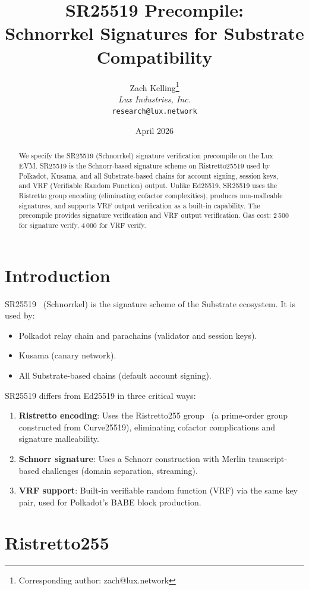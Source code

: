 \documentclass[11pt,a4paper]{article}
\title{SR25519 Precompile:\\Schnorrkel Signatures for Substrate Compatibility}
\author{
Zach Kelling\thanks{Corresponding author: zach@lux.network}\\
\textit{Lux Industries, Inc.}\\
\texttt{research@lux.network}
}
\date{April 2026}
\begin{document}
\luxcoverpage

\begin{abstract}
We specify the SR25519 (Schnorrkel) signature verification precompile on the
Lux EVM. SR25519 is the Schnorr-based signature scheme on Ristretto25519
used by Polkadot, Kusama, and all Substrate-based chains for account signing,
session keys, and VRF (Verifiable Random Function) output. Unlike Ed25519,
SR25519 uses the Ristretto group encoding (eliminating cofactor complexities),
produces non-malleable signatures, and supports VRF output verification as a
built-in capability. The precompile provides signature verification and VRF
output verification. Gas cost: 2\,500 for signature verify, 4\,000 for VRF verify.
\end{abstract}

\section{Introduction}

SR25519~\cite{schnorrkel} (Schnorrkel) is the signature scheme of the Substrate
ecosystem. It is used by:
\begin{itemize}
  \item Polkadot relay chain and parachains (validator and session keys).
  \item Kusama (canary network).
  \item All Substrate-based chains (default account signing).
\end{itemize}

SR25519 differs from Ed25519 in three critical ways:
\begin{enumerate}[label=(\roman*)]
  \item \textbf{Ristretto encoding}: Uses the Ristretto255 group~\cite{ristretto}
    (a prime-order group constructed from Curve25519), eliminating cofactor
    complications and signature malleability.
  \item \textbf{Schnorr signature}: Uses a Schnorr construction with
    Merlin transcript-based challenges (domain separation, streaming).
  \item \textbf{VRF support}: Built-in verifiable random function (VRF) via
    the same key pair, used for Polkadot's BABE block production.
\end{enumerate}

\section{Ristretto255}
\end{document}
